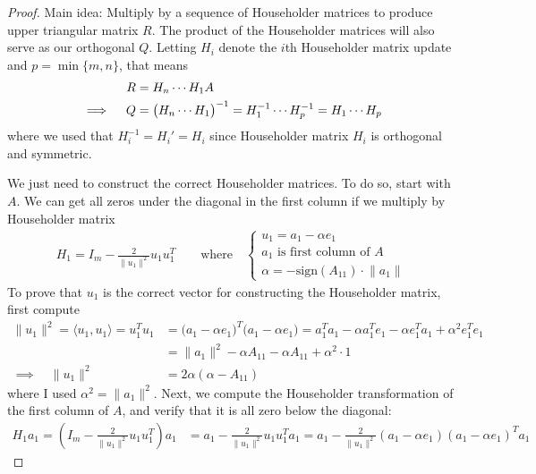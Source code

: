 \documentclass[12pt]{article}
\numberwithin{equation}{section} %
\theoremstyle{plain}
\theoremstyle{definition}
\theoremstyle{remark}
\begin{document}
\begin{proof}
Main idea: Multiply by a sequence of Householder matrices to produce
upper triangular matrix $R$. The product of the Householder matrices
will also serve as our orthogonal $Q$.
Letting $H_i$ denote the $i$th Householder matrix update and
$p=\min\{m,n\}$, that means
\begin{align}
  R &= H_{n} \cdots H_1 A \label{qrform} \\
  \implies\quad
  Q &= \big(H_{n} \cdots H_1\big)^{-1}
  = H_{1}^{-1} \cdots H_{p}^{-1}
  = H_{1} \cdots H_{p}
  \notag
\end{align}
where we used that $H^{-1}_i=H_i'=H_i$ since Householder matrix $H_i$ is
orthogonal and symmetric.

We just need to construct the correct Householder matrices. To do so,
start with $A$.  We can get all zeros under the diagonal in the
first column if we multiply by Householder matrix
\begin{align*}
  H_1 = I_m - \frac{2}{\lVert u_1\lVert^2}u_1u_1^T
  \qquad \text{where}\quad
  \begin{cases}
    u_1 = a_1 -\alpha e_1 \\
    \text{$a_1$ is first column of $A$} \\
    \alpha = -\text{sign}(A_{11})\cdot \lVert a_1\rVert
  \end{cases}
\end{align*}
To prove that $u_1$ is the correct vector for constructing the Householder
matrix, first compute
\begin{align*}
  \lVert u_1\rVert^2
  =
  \langle u_1, u_1\rangle
  = u_1^T u_1
  &=
  \big(a_1 - \alpha e_1\big)^T
  \big(a_1 - \alpha e_1\big)
  =
  a_1^Ta_1 - \alpha a_1^Te_1 - \alpha e_1^Ta_1 +\alpha^2e_1^Te_1
  \\
  &=
  \lVert a_1\rVert^2
  - \alpha A_{11} - \alpha A_{11} +\alpha^2\cdot 1
  \\
  \implies\quad
  \lVert u_1\rVert^2
  &=
  2\alpha(\alpha- A_{11})
\end{align*}
where I used $\alpha^2 =\lVert a_1\rVert^2$.
Next, we compute the Householder transformation of the first column of
$A$, and verify that it is all zero below the diagonal:
\begin{align*}
  H_1a_1
  = \left(I_m - \frac{2}{\lVert u_1\rVert^2}u_1u_1^T\right)a_1
  &= a_1 - \frac{2}{\lVert u_1\rVert^2}u_1u_1^Ta_1
  = a_1
  - \frac{2}{\lVert u_1\rVert^2}(a_1-\alpha e_1)(a_1-\alpha e_1)^Ta_1

\end{align*}
\end{proof}
\end{document}
